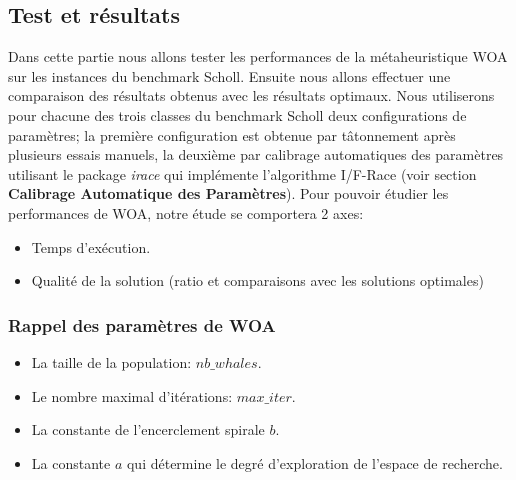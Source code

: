 \documentclass[12pt]{article}
\begin{document}
\subsection{Test et résultats }
Dans cette partie nous allons tester les performances de la métaheuristique WOA sur les instances du benchmark Scholl. Ensuite nous allons effectuer une comparaison des résultats obtenus avec les résultats optimaux. Nous utiliserons pour chacune des trois classes du benchmark Scholl deux configurations de paramètres; la première configuration est obtenue par tâtonnement après plusieurs essais manuels, la deuxième par calibrage automatiques des paramètres utilisant le package \emph{irace} qui implémente l’algorithme I/F-Race (voir section \textbf{Calibrage Automatique des Paramètres}).
Pour pouvoir étudier les performances de WOA, notre étude se comportera 2 axes:
\begin{itemize}
    \item Temps d'exécution.
    \item Qualité de la solution  (ratio et comparaisons avec les solutions optimales)
\end{itemize}

\subsubsection{Rappel des paramètres de WOA }
\begin{itemize}
    \item La taille de la population: \(nb\_whales\).
    \item Le nombre maximal d’itérations: \(max\_iter\).
    \item La constante de l’encerclement spirale \(b\).
    \item La constante \(a\) qui détermine le degré d’exploration de l’espace de recherche.
\end{itemize}
\end{document}
